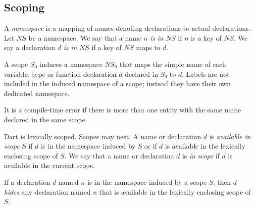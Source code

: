 \documentclass{article}
\begin{document}

\subsection{Scoping}

\LMHash{}
A {\em namespace} is a mapping of names denoting declarations to actual declarations.  Let $NS$ be a namespace. We say that a name $n$ {\em is in }$NS$ if $n$ is a key of $NS$. We say a declaration $d$ {\em is in }$NS$ if a key of $NS$ maps to $d$.

\LMHash{}
A scope $S_0$ induces a namespace $NS_0$ that maps the simple name of each variable, type or function declaration $d$ declared in $S_0$ to $d$. Labels are not included in the induced namespace of a scope; instead they have their own dedicated namespace.


\LMHash{}
It is a compile-time error if there is more than one entity with the same name declared in the same scope.


\LMHash{}
Dart is lexically scoped.    Scopes may nest.  A name or declaration $d$ is {\em available in scope} $S$ if $d$ is in the namespace induced by $S$ or if $d$ is available in the lexically enclosing scope of $S$. We  say that a name or declaration $d$ is {\em in scope} if $d$ is available in the current scope.


\LMHash{}
If a  declaration $d$ named $n$ is in the namespace induced by a scope $S$, then $d$ {\em hides} any declaration named $n$ that is available in the lexically enclosing scope of $S$.

\end{document}
